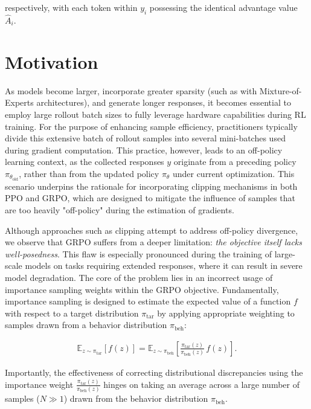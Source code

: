 respectively, with each token within $y_i$ possessing the identical advantage value $\widehat{A}_{i}$.

\section{Motivation}
\label{sec:motivation}

As models become larger, incorporate greater sparsity (such as with Mixture-of-Experts architectures), and generate longer responses, it becomes essential to employ large rollout batch sizes to fully leverage hardware capabilities during RL training. For the purpose of enhancing sample efficiency, practitioners typically divide this extensive batch of rollout samples into several mini-batches used during gradient computation. This practice, however, leads to an off-policy learning context, as the collected responses $y$ originate from a preceding policy $\pi_{\theta_\text{old}}$, rather than from the updated policy $\pi_\theta$ under current optimization. This scenario underpins the rationale for incorporating clipping mechanisms in both PPO and GRPO, which are designed to mitigate the influence of samples that are too heavily "off-policy" during the estimation of gradients.

Although approaches such as clipping attempt to address off-policy divergence, we observe that GRPO suffers from a deeper limitation: \textit{the objective itself lacks well-posedness}. This flaw is especially pronounced during the training of large-scale models on tasks requiring extended responses, where it can result in severe model degradation. The core of the problem lies in an incorrect usage of importance sampling weights within the GRPO objective. Fundamentally, importance sampling is designed to estimate the expected value of a function $f$ with respect to a target distribution $\pi_\text{tar}$ by applying appropriate weighting to samples drawn from a behavior distribution $\pi_\text{beh}$:

\begin{align}
\mathbb{E}_{z \sim \pi_\text{tar}} \left[ f(z) \right] = \mathbb{E}_{z \sim \pi_\text{beh}} \left[ \frac{ \pi_\text{tar} (z) }{ \pi_\text{beh} (z)} \, f(z) \right].
\end{align}

Importantly, the effectiveness of correcting distributional discrepancies using the importance weight $\frac{ \pi_\text{tar} (z) }{ \pi_\text{beh} (z)}$ hinges on taking an average across a large number of samples ($N \gg 1$) drawn from the behavior distribution $\pi_\text{beh}$.


